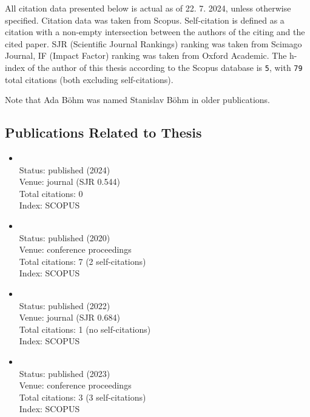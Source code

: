 All citation data presented below is actual as of 22. 7. 2024, unless otherwise
            specified. Citation data was taken from Scopus.
Self-citation is defined as a citation with a non-empty intersection between the authors of the citing and the cited paper.
SJR (Scientific Journal Rankings) ranking was taken from Scimago Journal,
IF (Impact Factor) ranking was taken from Oxford Academic.
The h-index of the author of this thesis according to the Scopus database is \texttt{5},
with \texttt{79} total citations (both excluding self-citations).

Note that Ada Böhm was named Stanislav Böhm in older publications.

\begin{refsection}
\section*{Publications Related to Thesis}
    \begin{itemize}
		\item{}\vspace{2mm}\\Status: published (2024)\\Venue: journal (SJR 0.544)\\Total citations: 0\\Index: SCOPUS
		\item{}\vspace{2mm}\\Status: published (2020)\\Venue: conference proceedings\\Total citations: 7 (2 self-citations)\\Index: SCOPUS
		\item{}\vspace{2mm}\\Status: published (2022)\\Venue: journal (SJR 0.684)\\Total citations: 1 (no self-citations)\\Index: SCOPUS
		\item{}\vspace{2mm}\\Status: published (2023)\\Venue: conference proceedings\\Total citations: 3 (3 self-citations)\\Index: SCOPUS
\end{itemize}


\end{refsection}
